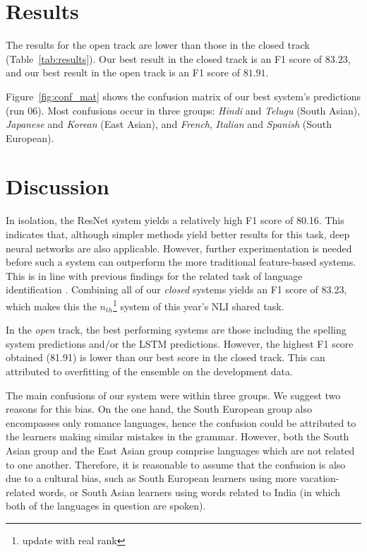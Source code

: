 \documentclass[11pt,letterpaper]{article}
\begin{document}
\section{Results}
The results for the open track are lower than those in the closed track (Table~\ref{tab:results}).
Our best result in the closed track is an F1 score of $83.23$, and our best result in the open track is an F1 score of $81.91$.

Figure~\ref{fig:conf_mat} shows the confusion matrix of our best system's predictions (run 06).
Most confusions occur in three groups: \textit{Hindi} and \textit{Telugu} (South Asian), \textit{Japanese} and \textit{Korean} (East Asian), and \textit{French}, \textit{Italian} and \textit{Spanish} (South European).


\section{Discussion}

In isolation, the ResNet system yields a relatively high F1 score of 80.16.
This indicates that, although simpler methods yield better results for this task, deep neural networks are also applicable.
However, further experimentation is needed before such a system can outperform the more traditional feature-based systems.
This is in line with previous findings for the related task of language identification \citep{medvedeva:2017}.
Combining all of our \textit{closed} systems yields an F1 score of 83.23, which makes this the $n_{th}$\footnote{update with real rank} system of this year's NLI shared task.

In the \textit{open} track, the best performing systems are those including the spelling system predictions and/or the LSTM predictions.
However, the highest F1 score obtained (81.91) is lower than our best score in the closed track.
This can attributed to overfitting of the ensemble on the development data.

The main confusions of our system were within three groups.
We suggest two reasons for this bias.
On the one hand, the South European group also encompasses only romance languages, hence the confusion could be attributed to the learners making similar mistakes in the grammar.
However, both the South Asian group and the East Asian group comprise languages which are not related to one another.
Therefore, it is reasonable to assume that the confusion is also due to a cultural bias, such as South European learners using more vacation-related words, or South Asian learners using words related to India (in which both of the languages in question are spoken).
\end{document}
